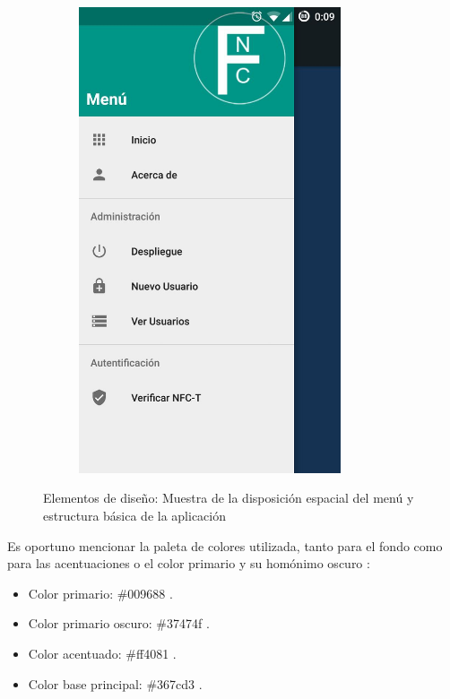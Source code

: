 \documentclass[../PFC.tex]{subfiles}
\begin{document}
\begin{figure}[H]
    \qquad\qquad\qquad  %
    \begin{subfigure}{0.4\textwidth}  
       \centering
       \includegraphics[width=0.85\textwidth]{./img/menuDesplegado}
    \end{subfigure}   
  \caption{Elementos de diseño: Muestra de la disposición espacial del menú y estructura básica de la aplicación}
  \label{img:designElements}
\end{figure}

Es oportuno mencionar la paleta de colores utilizada, tanto para el fondo como para las acentuaciones o el color primario y su homónimo oscuro : 

\begin{itemize}
\item{Color primario: \#009688 .}
\item{Color primario oscuro: \#37474f .}
\item{Color acentuado: \#ff4081 .}
\item{Color base principal: \#367cd3 .}
\end{itemize}
\end{document}
